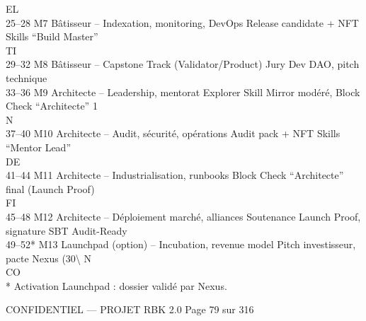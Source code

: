 \vspace{0.5em}
\vspace{0.5em}
\vspace{0.5em}
EL\\
25–28       M7       Bâtisseur – Indexation, monitoring, DevOps           Release candidate + NFT Skills “Build Master”\\
\vspace{0.5em}
\vspace{0.5em}
\vspace{0.5em}
\vspace{0.5em}
TI\\
29–32       M8       Bâtisseur – Capstone Track (Validator/Product)       Jury Dev DAO, pitch technique\\
33–36       M9       Architecte – Leadership, mentorat Explorer           Skill Mirror modéré, Block Check “Architecte” 1\\
\vspace{0.5em}
\vspace{0.5em}
\vspace{0.5em}
\vspace{0.5em}
N\\
37–40       M10      Architecte – Audit, sécurité, opérations             Audit pack + NFT Skills “Mentor Lead”\\
\vspace{0.5em}
\vspace{0.5em}
\vspace{0.5em}
\vspace{0.5em}
DE\\
41–44       M11      Architecte – Industrialisation, runbooks             Block Check “Architecte” final (Launch Proof)\\
\vspace{0.5em}
\vspace{0.5em}
\vspace{0.5em}
\vspace{0.5em}
FI\\
45–48       M12      Architecte – Déploiement marché, alliances           Soutenance Launch Proof, signature SBT Audit-Ready\\
49–52*      M13      Launchpad (option) – Incubation, revenue model       Pitch investisseur, pacte Nexus (30\textbackslash{}%
\vspace{0.5em}
N\\
CO\\
* Activation Launchpad : dossier validé par Nexus.\\
\vspace{0.5em}
\vspace{0.5em}
\vspace{0.5em}
\vspace{0.5em}
\begin{confidential}CONFIDENTIEL — PROJET RBK 2.0                                   Page 79 sur 316\end{confidential}
